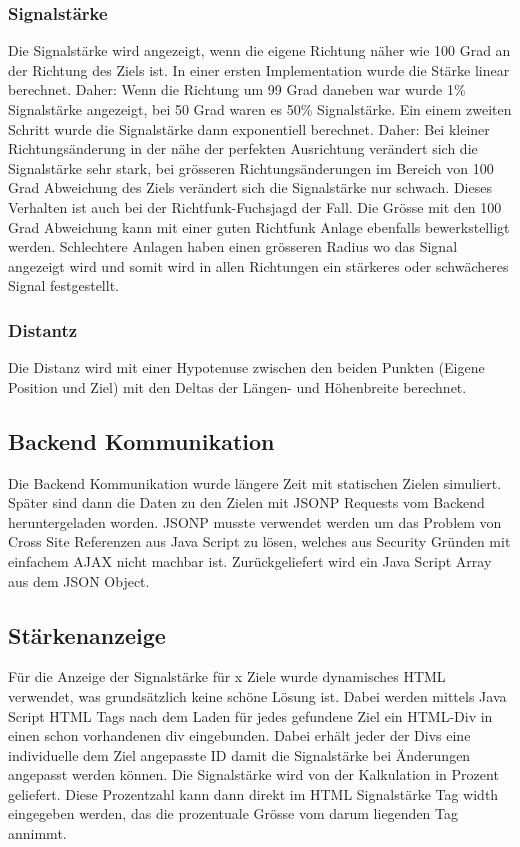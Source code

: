 \subsubsection{Signalstärke} %
\label{ssub:signalstärke}
Die Signalstärke wird angezeigt, wenn die eigene Richtung näher wie 100 Grad an der Richtung des Ziels ist. In einer ersten Implementation wurde die Stärke linear berechnet. Daher: Wenn die Richtung um 99 Grad daneben war wurde 1\% Signalstärke angezeigt, bei 50 Grad waren es 50\% Signalstärke. Ein einem zweiten Schritt wurde die Signalstärke dann exponentiell berechnet. Daher: Bei kleiner Richtungsänderung in der nähe der perfekten Ausrichtung verändert sich die Signalstärke sehr stark, bei grösseren Richtungsänderungen im Bereich von 100 Grad Abweichung des Ziels verändert sich die Signalstärke nur schwach. Dieses Verhalten ist auch bei der Richtfunk-Fuchsjagd der Fall. Die Grösse mit den 100 Grad Abweichung kann mit einer guten Richtfunk Anlage ebenfalls bewerkstelligt werden. Schlechtere Anlagen haben einen grösseren Radius wo das Signal angezeigt wird und somit wird in allen Richtungen ein stärkeres oder schwächeres Signal festgestellt.
\subsubsection{Distantz} %
\label{ssub:distantz}
Die Distanz wird mit einer Hypotenuse zwischen den beiden Punkten (Eigene Position und Ziel) mit den Deltas der Längen- und Höhenbreite berechnet. 

\subsection{Backend Kommunikation} %
\label{sub:backend_kommunikation}
Die Backend Kommunikation wurde längere Zeit mit statischen Zielen simuliert. Später sind dann die Daten zu den Zielen mit JSONP Requests vom Backend heruntergeladen worden. JSONP musste verwendet werden um das Problem von Cross Site Referenzen aus Java Script zu lösen, welches aus Security Gründen mit einfachem AJAX nicht machbar ist. Zurückgeliefert wird ein Java Script Array aus dem JSON Object.

\subsection{Stärkenanzeige} %
\label{sub:stärkenanzeige}
Für die Anzeige der Signalstärke für x Ziele wurde dynamisches HTML verwendet, was grundsätzlich keine schöne Lösung ist. Dabei werden mittels Java Script HTML Tags nach dem Laden für jedes gefundene Ziel ein HTML-Div in einen schon vorhandenen div eingebunden. Dabei erhält jeder der Divs eine individuelle dem Ziel angepasste ID damit die Signalstärke bei Änderungen angepasst werden können. Die Signalstärke wird von der Kalkulation in Prozent geliefert. Diese Prozentzahl kann dann direkt im HTML Signalstärke Tag width eingegeben werden, das die prozentuale Grösse vom darum liegenden Tag annimmt.

